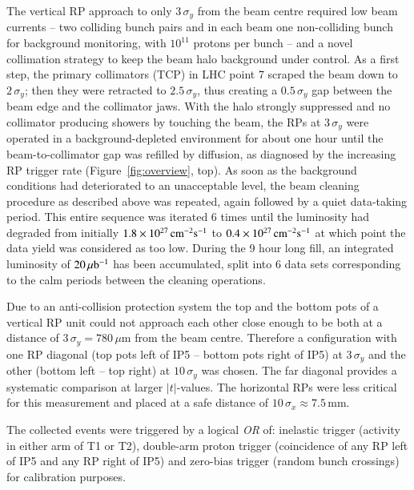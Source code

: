 The vertical RP approach to only $3\,\sigma_{y}$ from the beam centre required
low beam currents -- two colliding bunch pairs and in each beam one 
non-colliding bunch for background monitoring, with $10^{11}$ protons per bunch 
-- and a novel collimation strategy 
to keep the beam halo background under control. As a first step, the primary 
collimators (TCP) in LHC point 7 scraped the beam down to $2\,\sigma_{y}$; then 
they were retracted to $2.5\,\sigma_{y}$, thus creating a $0.5\,\sigma_{y}$ gap 
between
the beam edge and the collimator jaws. With the halo strongly suppressed 
and no collimator producing showers by touching the beam, the RPs at 
$3\,\sigma_{y}$ were operated in a background-depleted environment for about one 
hour until the beam-to-collimator gap was refilled by diffusion, as 
diagnosed by the increasing RP trigger rate (Figure~\ref{fig:overview}, top). As soon as the background conditions
had deteriorated to an unacceptable level, the beam cleaning procedure as described above was repeated, again followed by a quiet data-taking period.
This entire sequence was iterated 6 times until the luminosity had degraded 
from initially $1.8\times10^{27}\,\rm cm^{-2}s^{-1}$ to 
$0.4\times10^{27}\,\rm cm^{-2}s^{-1}$ %
at which point the data yield was considered as too low. 
During the 9 hour long fill, an integrated luminosity of $20\,\rm \mu b^{-1}$ 
has been accumulated, split into 6 data sets corresponding to the calm periods 
between the cleaning operations. 

Due to an anti-collision protection system the top and the bottom pots of a 
vertical RP unit could not approach each other close enough to be both at a 
distance of $3\,\sigma_{y} = 780\,\mu$m from the beam centre. Therefore a 
configuration with one RP diagonal (top pots left of IP5 -- bottom pots right
of IP5) at $3\,\sigma_{y}$ and the other (bottom left -- top right) at 
$10\,\sigma_{y}$ was chosen. The far diagonal provides a systematic comparison
at larger $|t|$-values.
The horizontal RPs were less critical for this measurement and placed at a
safe distance of $10\,\sigma_{x} \approx 7.5$\,mm.

The collected events were triggered by a logical \textit{OR} of: inelastic 
trigger (activity in either arm of T1 or T2), double-arm proton trigger 
(coincidence of any RP left of IP5 and any RP right of IP5) and zero-bias trigger
(random bunch crossings) for calibration purposes.

